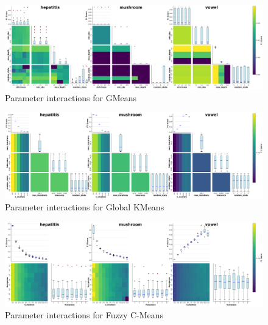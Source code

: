 \begin{figure}[!htbp]
    \includegraphics[width=\textwidth]{figures/interactions_gmeans.png}
    \caption{Parameter interactions for GMeans}
    \label{fig:interactions_gmeans_full}
\end{figure}


\FloatBarrier

\begin{figure}[!htbp]
    \includegraphics[width=\textwidth]{figures/interactions_global_kmeans.png}
    \caption{Parameter interactions for Global KMeans}
    \label{fig:interactions_global_kmeans_full}
\end{figure}


\FloatBarrier

\begin{figure}[!htbp]
    \includegraphics[width=\textwidth]{figures/interactions_fuzzy_cmeans.png}
    \caption{Parameter interactions for Fuzzy C-Means}
    \label{fig:interactions_fuzzy_cmeans_full}
\end{figure}


\FloatBarrier

